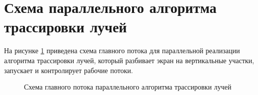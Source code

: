 \section{Схема параллельного алгоритма трассировки лучей}

На рисунке \ref{fig:trass_split} приведена схема главного потока для параллельной реализации алгоритма трассировки лучей, который разбивает экран на вертикальные участки, запускает и контролирует рабочие потоки.

\begin{figure}[h!]
	
	
	\caption{Схема главного потока параллельного алгоритма трассировки лучей}
	
	\label{fig:trass_split}
	
\end{figure}

